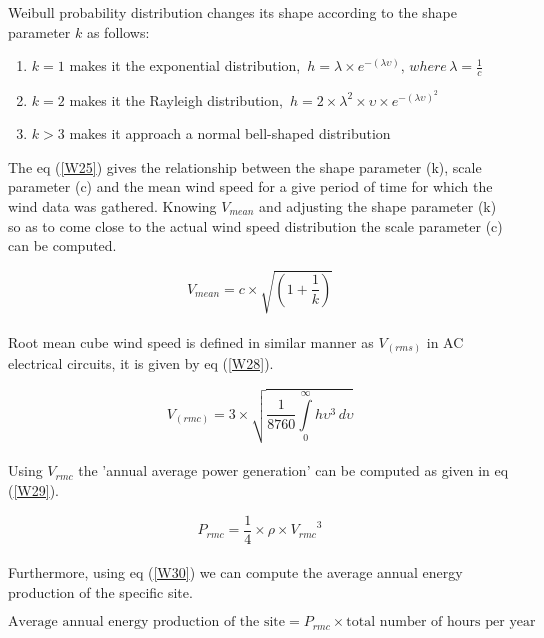 Weibull probability distribution changes its shape according to the shape parameter $k$ as follows:

\begin{enumerate}
\item \blindtext 	$k=1$ makes it the exponential distribution, \,$h = \lambda \times e^{-(\lambda\upsilon)},\, where \, \lambda = \frac{1}			{c}$
\item \blindtext $k=2$ makes it the Rayleigh distribution, \,$h = 2 \times \lambda^2 \times \upsilon \times e^{-(\lambda\upsilon)^2}$
\item \blindtext $k>3$ makes it approach a normal bell-shaped distribution
\end{enumerate}

The eq (\ref{W25}) gives the relationship between the shape parameter (k), scale parameter (c) and the mean wind speed for a give period of time for which the wind data was gathered. Knowing $V_{mean}$ and adjusting the shape parameter (k) so as to come close to the actual wind speed distribution the scale parameter (c) can be computed.

\begin{equation}
\label{W25}
V_{mean} = c \times \sqrt{\left(1 + \frac{1}{k}\right)}
\end{equation}\\


Root mean cube wind speed is defined in similar manner as $V_(rms)$ in AC electrical circuits, it is given by eq (\ref{W28}).

\begin{equation}
\label{W28}
	V_(rmc) = 3 \times \sqrt{\frac{1}{8760}\int\limits_0^\infty h\upsilon^3 \, d\upsilon}
\end{equation}\\

Using $V_{rmc}$ the 'annual average power generation' can be computed as given in eq (\ref{W29}).

\begin{equation}
\label{W29}
	P_{rmc} = \frac{1}{4}\times \rho \times {V_{rmc}}^3
\end{equation}\\

Furthermore, using eq (\ref{W30}) we can compute the average annual energy production of the specific site.
	
\begin{equation}
\label{W30}
	\text{Average annual energy production of the site} = P_{rmc} \times \text{total number of hours per year}
\end{equation}\\

